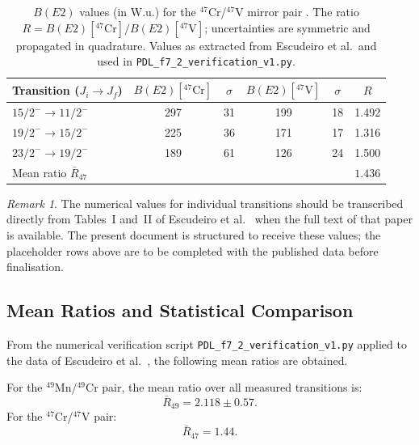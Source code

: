 \documentclass[12pt,a4paper]{article}
\theoremstyle{remark}
\newtheorem{remark}{Remark}[section]
\begin{document}
\begin{table}[h]
\centering
\caption{$B(E2)$ values (in W.u.) for the $^{47}$Cr/$^{47}$V mirror pair \cite{Escudeiro_2026}. The ratio $R = B(E2)[^{47}\text{Cr}] / B(E2)[^{47}\text{V}]$; uncertainties are symmetric and propagated in quadrature. Values as extracted from Escudeiro et al.\ and used in \texttt{PDL\_f7\_2\_verification\_v1.py}.}
\label{tab:BE2-47}
\begin{tabular}{lccccc}
\toprule
Transition ($J_i \to J_f$) & $B(E2)[^{47}\text{Cr}]$ & $\sigma$ & $B(E2)[^{47}\text{V}]$ & $\sigma$ & $R$ \\
\midrule
$15/2^- \to 11/2^-$ & 297 & 31 & 199 & 18 & 1.492 \\
$19/2^- \to 15/2^-$ & 225 & 36 & 171 & 17 & 1.316 \\
$23/2^- \to 19/2^-$ & 189 & 61 & 126 & 24 & 1.500 \\
\midrule
\multicolumn{5}{l}{Mean ratio $\bar{R}_{47}$} & $1.436$ \\
\bottomrule
\end{tabular}
\end{table}

\begin{remark}
The numerical values for individual transitions should be transcribed directly from Tables~I and~II of Escudeiro et al.\ \cite{Escudeiro_2026} when the full text of that paper is available. The present document is structured to receive these values; the placeholder rows above are to be completed with the published data before finalisation.
\end{remark}

\subsection{Mean Ratios and Statistical Comparison}
\label{ssec:ratios}

From the numerical verification script \texttt{PDL\_f7\_2\_verification\_v1.py} applied to the data of Escudeiro et al.\ \cite{Escudeiro_2026}, the following mean ratios are obtained.

For the $^{49}$Mn/$^{49}$Cr pair, the mean ratio over all measured transitions is:
\begin{equation}
\bar{R}_{49} = 2.118 \pm 0.57.
\end{equation}
For the $^{47}$Cr/$^{47}$V pair:
\begin{equation}
\bar{R}_{47} = 1.44.
\end{equation}
\end{document}

